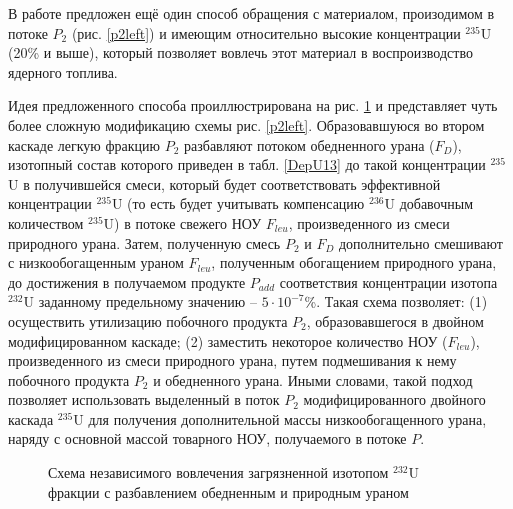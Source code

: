 {В работе предложен ещё один способ обращения с материалом, произодимом в потоке $P_2$ (рис. \ref{p2left}) и имеющим относительно высокие концентрации $^{235}$U (20\% и выше), который позволяет вовлечь этот материал в воспроизводство ядерного топлива. 

Идея предложенного способа проиллюстрирована на рис. \ref{P2utilization} и представляет чуть более сложную модификацию схемы рис. \ref{p2left}. Образовавшуюся во втором каскаде легкую фракцию $P_2$ разбавляют потоком обедненного урана ($F_D$), изотопный состав которого приведен в табл. \ref{DepU13} до такой концентрации $^{235}$U в получившейся смеси, который будет соответствовать эффективной концентрации $^{235}$U (то есть будет учитывать компенсацию $^{236}$U добавочным количеством $^{235}$U) в потоке свежего НОУ $F_{leu}$, произведенного из смеси природного урана. Затем, полученную смесь $P_2$ и $F_D$ дополнительно смешивают с низкообогащенным ураном $F_{leu}$, полученным обогащением природного урана, до достижения в получаемом продукте $P_{add}$ соответствия концентрации изотопа $^{232}$U заданному предельному значению -- $5\cdot10^{-7}$\%. Такая схема позволяет: (1) осуществить утилизацию побочного продукта $P_2$, образовавшегося в двойном модифицированном каскаде; (2) заместить некоторое количество НОУ ($F_{leu}$), произведенного из смеси природного урана, путем подмешивания к нему побочного продукта $P_2$ и обедненного урана. Иными словами, такой подход позволяет использовать выделенный в поток $P_2$ модифицированного двойного каскада $^{235}$U для получения дополнительной массы низкообогащенного урана, наряду с основной массой товарного НОУ, получаемого в потоке $P$. 

\begin{figure}[ht]
    \caption{Схема независимого вовлечения загрязненной изотопом $^{232}$U фракции с разбавлением обедненным и природным ураном}\label{P2utilization}
\end{figure}

}
